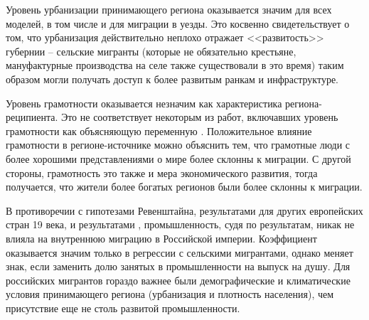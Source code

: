 \documentclass[a4paper,12pt]{article}
\begin{document}
Уровень урбанизации принимающего региона оказывается значим для всех моделей, в том числе и для миграции в уезды. Это косвенно свидетельствует о том, что урбанизация действительно неплохо отражает <<развитость>> губернии -- сельские мигранты (которые не обязательно крестьяне, мануфактурные производства на селе также существовали в это время) таким образом могли получать доступ к более развитым ранкам и инфраструктуре.

\afterpage{%
	
}\par

Уровень грамотности оказывается незначим как характеристика региона-реципиента. Это не соответствует некоторым из работ, включавших уровень грамотности как объясняющую переменную \citep{nicholas_internal_1987}. 
Положительное влияние грамотности в регионе-источнике можно объяснить тем, что грамотные люди с более хорошими представлениями о мире более склонны к миграции. С другой стороны, грамотность это также и мера экономического развития, тогда получается, что жители более богатых регионов были более склонны к миграции.

В противоречии с гипотезами Ревенштайна, результатами для других европейских стран 19 века, и результатами \citeauthor{leasure_internal_1968}, промышленность, судя по результатам, никак не влияла на внутреннюю миграцию в Российской империи. Коэффициент оказывается значим только в регрессии с сельскими мигрантами, однако меняет знак, если заменить долю занятых в промышленности на выпуск на душу. Для российских мигрантов гораздо важнее были демографические и климатические условия принимающего региона (урбанизация и плотность населения), чем присутствие еще не столь развитой промышленности.

\end{document}
